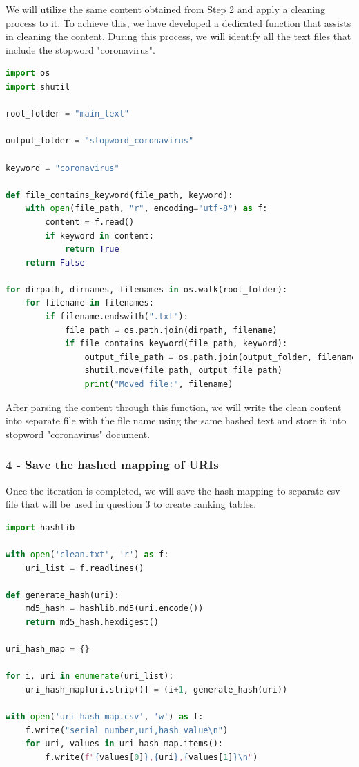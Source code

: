 \documentclass[12pt]{article}
\begin{document}
We will utilize the same content obtained from Step 2 and apply a cleaning process to it. To achieve this, we have developed a dedicated function that assists in cleaning the content. During this process, we will identify all the text files that include the stopword "coronavirus".
\\
\begin{lstlisting}[language=Python, caption=function to clean the html content]
import os
import shutil

root_folder = "main_text"

output_folder = "stopword_coronavirus"

keyword = "coronavirus"

def file_contains_keyword(file_path, keyword):
    with open(file_path, "r", encoding="utf-8") as f:
        content = f.read()
        if keyword in content:
            return True
    return False

for dirpath, dirnames, filenames in os.walk(root_folder):
    for filename in filenames:
        if filename.endswith(".txt"):
            file_path = os.path.join(dirpath, filename)
            if file_contains_keyword(file_path, keyword):
                output_file_path = os.path.join(output_folder, filename)
                shutil.move(file_path, output_file_path)
                print("Moved file:", filename)

\end{lstlisting} 

After parsing the content through this function, we will write the clean content into separate file with the file name using the same hashed text and store it into stopword "coronavirus" document.

\subsubsection*{4 - Save the hashed mapping of URIs}

Once the iteration is completed, we will save the hash mapping to separate csv file that will be used in question 3 to create ranking tables.
\\
\begin{lstlisting}[language=Python, caption=Hash mapping conversion to csv]
import hashlib

with open('clean.txt', 'r') as f:
    uri_list = f.readlines()

def generate_hash(uri):
    md5_hash = hashlib.md5(uri.encode())
    return md5_hash.hexdigest()

uri_hash_map = {}

for i, uri in enumerate(uri_list):
    uri_hash_map[uri.strip()] = (i+1, generate_hash(uri))

with open('uri_hash_map.csv', 'w') as f:
    f.write("serial_number,uri,hash_value\n")
    for uri, values in uri_hash_map.items():
        f.write(f"{values[0]},{uri},{values[1]}\n")


\end{lstlisting}
\clearpage
\end{document}
